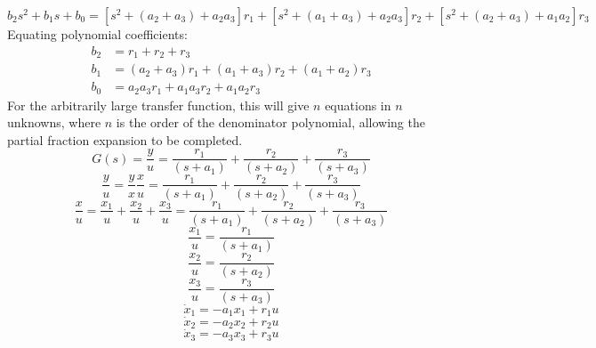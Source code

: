 \begin{equation*}
b_2s^2+b_1s+b_0=[s^2+(a_2+a_3)+a_2a_3]r_1+[s^2+(a_1+a_3)+a_2a_3]r_2+[s^2+(a_2+a_3)+a_1a_2]r_3
\end{equation*}
Equating polynomial coefficients:
\begin{equation*}
  \begin{split}
    b_2&=r_1+r_2+r_3 \\
    b_1&=(a_2+a_3)r_1+(a_1+a_3)r_2+(a_1+a_2)r_3 \\
    b_0&=a_2a_3r_1+a_1a_3r_2+a_1a_2r_3
  \end{split}
\end{equation*}
For the arbitrarily large transfer function, this will give $n$ equations in $n$ unknowns, where $n$ is the order of the denominator polynomial, allowing the partial fraction expansion to be completed.
\begin{equation*}
  G(s)=\frac{y}{u}=\frac{r_1}{(s+a_1)}+\frac{r_2}{(s+a_2)}+\frac{r_3}{(s+a_3)}
\end{equation*}
\begin{equation*}
  \frac{y}{u}=\frac{y}{x}\frac{x}{u}=\frac{r_1}{(s+a_1)}+\frac{r_2}{(s+a_2)}+\frac{r_3}{(s+a_3)}
\end{equation*}
\begin{equation*}
  \frac{x}{u}=\frac{x_1}{u}+\frac{x_2}{u}+\frac{x_3}{u}=\frac{r_1}{(s+a_1)}+\frac{r_2}{(s+a_2)}+\frac{r_3}{(s+a_3)}
\end{equation*}
\begin{equation*}
  \frac{x_1}{u}=\frac{r_1}{(s+a_1)}
\end{equation*}
\begin{equation*}
  \frac{x_2}{u}=\frac{r_2}{(s+a_2)}
\end{equation*}
\begin{equation*}
  \frac{x_3}{u}=\frac{r_3}{(s+a_3)}
\end{equation*}
\begin{equation*}
  \dot{x}_1=-a_1x_1+r_1u
\end{equation*}
\begin{equation*}
  \dot{x}_2=-a_2x_2+r_2u
\end{equation*}
\begin{equation*}
  \dot{x}_3=-a_3x_3+r_3u
\end{equation*}
